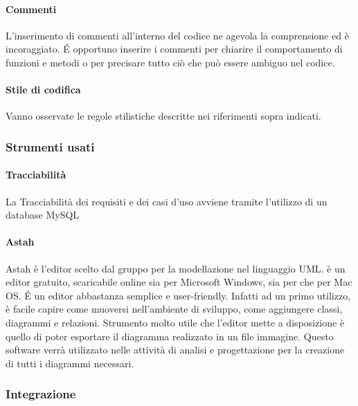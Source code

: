 \paragraph{Commenti}

L'inserimento di commenti all'interno del codice ne agevola la
comprensione ed è incoraggiato. \'E opportuno inserire i commenti per chiarire il
comportamento di funzioni e metodi o per precisare tutto ciò che può essere ambiguo
nel codice.

\paragraph{Stile di codifica}
Vanno osservate le regole stilistiche descritte nei riferimenti sopra indicati.

\subsubsection{Strumenti usati}

\paragraph{Tracciabilità}

La Tracciabilità dei requisiti e dei casi d’uso avviene tramite l’utilizzo di un database MySQL

\paragraph{Astah}

Astah è l’editor scelto dal gruppo per la modellazione nel linguaggio UML.  è un editor
gratuito, scaricabile online sia per Microsoft Windows, sia per  che per Mac OS. \'E
un editor abbastanza semplice e user-friendly. Infatti ad un primo utilizzo, è facile capire come
muoversi nell’ambiente di sviluppo, come aggiungere classi, diagrammi e relazioni. Strumento
molto utile che l’editor mette a disposizione è quello di poter esportare il diagramma realizzato in
un file immagine. Questo software verrà utilizzato nelle attività di analisi e progettazione per la creazione
di tutti i diagrammi  necessari.



\subsubsection{Integrazione}

